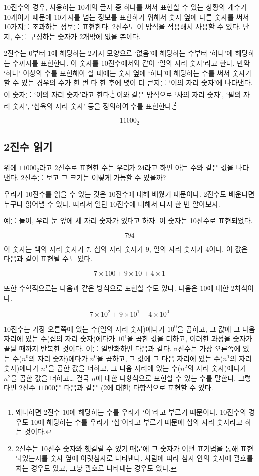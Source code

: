 \documentclass{article}
\begin{document}
10진수의 경우, 사용하는 10개의 글자 중 하나를 써서 표현할 수 있는 상황의 개수가
10개이기 때문에 10가지를 넘는 정보를 표현하기 위해서 숫자 옆에 다른 숫자를 써서
10가지를 초과하는 정보를 표현한다. 2진수도 이 방식을 적용해서 사용할 수 있다.
단지, 수를 구성하는 숫자가 2개밖에 없을 뿐이다.

2진수는 0부터 1에 해당하는 2가지 모양으로 `없음'에 해당하는 수부터 `하나'에
해당하는 수까지를 표현한다. 이 숫자를 10진수에서와 같이 `일의 자리 숫자'라고 한다.
만약 `하나' 이상의 수를 표현해야 할 때에는 숫자 옆에 `하나'에 해당하는 수를 써서
숫자가 할 수 있는 경우의 수가 한 번 다 한 후에 몇이 더 큰지를 `이의 자리 숫자'에
나타낸다. 이 숫자를 `이의 자리 숫자'라고 한다.\footnote{왜냐하면 2진수 $10$에
해당하는 수를 우리가 `이'라고 부르기 때문이다. 10진수의 경우도 $10$에 해당하는
수를 우리가 `십'이라고 부르기 때문에 십의 자리 숫자라고 하는 것이다.}
이와 같은 방식으로 `사의 자리 숫자', `팔의 자리 숫자', `십육의 자리 숫자' 등을
정의하여 수를 표현한다.\footnote{2진수는 10진수 숫자와 헷갈릴 수 있기 때문에 
그 숫자가 어떤 표기법을 통해 표현되었는지를 숫자 옆에 아랫첨자로 나타낸다. 사람에
따라 첨자 안의 숫자에 괄호를 치는 경우도 있고, 그냥 괄호로 나타내는 경우도 있다.}

$$
11000_2
$$

\subsection{2진수 읽기}

위에 $11000_2$라고 2진수로 표현한 수는 우리가 $24$라고 하면 아는 수와 같은 값을
나타낸다. 2진수를 보고 그 크기는 어떻게 가늠할 수 있을까?

우리가 10진수를 읽을 수 있는 것은 10진수에 대해 배웠기 때문이다. 2진수도 배운다면
누구나 읽어낼 수 있다. 따라서 일단 10진수에 대해서 다시 한 번 알아보자.

예를 들어, 우리 눈 앞에 세 자리 숫자가 있다고 하자. 이 숫자는 10진수로 표현되었다.

$$
794
$$

이 숫자는 백의 자리 숫자가 7, 십의 자리 숫자가 9, 일의 자리 숫자가 4이다.
이 값은 다음과 같이 표현될 수도 있다.

$$
7 \times 100 + 9 \times 10 + 4 \times 1
$$

또한 수학적으로는 다음과 같은 방식으로 표현할 수도 있다. 다음은 $10$에 대한
2차식이다.

$$
7 \times 10^2 + 9 \times 10^1 + 4 \times 10^0
$$

10진수는 가장 오른쪽에 있는 수(일의 자리 숫자)에다가 $10^0$을 곱하고, 그 값에
그 다음 자리에 있는 수(십의 자리 숫자)에다가 $10^1$을 곱한 값을 더하고,
이러한 과정을 숫자가 끝날 때까지 반복한 것이다. 이를 일반화하면 다음과 같다.
n진수는 가장 오른쪽에 있는 수($n^0$의 자리 숫자)에다가 $n^0$을 곱하고, 그 값에
그 다음 자리에 있는 수($n^1$의 자리 숫자)에다가 $n^1$을 곱한 값을 더하고,
그 다음 자리에 있는 수($n^2$의 자리 숫자)에다가 $n^2$을 곱한 값을 더하고\dots
결국 $n$에 대한 다항식으로 표현할 수 있는 수를 말한다.
그렇다면 2진수 $11000$은 다음과 같은 (2에 대한) 다항식으로 표현할 수 있다.
\end{document}
